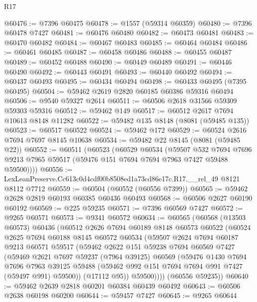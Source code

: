 \begin{lexlean}{R17}
\begin{coremodule}
@60476 := @7396 @60475
@60478 := @1557 (@59314 @60359)
@60480 := @7396 @60478 @7427
@60481 := @60476 @60480
@60482 := @60473 @60481
@60483 := @60470 @60482
@60484 := @60467 @60483
@60485 := @60464 @60484
@60486 := @60461 @60485
@60487 := @60458 @60486
@60488 := @60455 @60487
@60489 := @60452 @60488
@60490 := @60449 @60489
@60491 := @60446 @60490
@60492 := @60443 @60491
@60493 := @60440 @60492
@60494 := @60437 @60493
@60495 := @60434 @60494
@60498 := @60433 @60495 (@7395 @60495)
@60504 := @59462 @2619 @2820 @60185 @60386 @59316 @60494
@60506 := @9540 @59327 @2614
@60511 := @60506 @2618 @31566 @59309 @59303 @59316
@60512 := @59462 @149
@60517 := @60512 @2617 @7694 @10613 @8148 @11282
@60522 := @59482 @135 @8148 (@8081 (@59485 @135))
@60523 := @60517 @60522
@60524 := @59462 @172
@60529 := @60524 @2616 @7694 @7697 @8145 @10638
@60534 := @59482 @22 @8145 (@8081 (@59485 @22))
@60552 := @60511
    (@60523
      (@60529
        @60534
        (@59507
          @532
          @7694
          @7696
          @9213
          @7965
          @59517
          (@59476 @151 @7694 @7694 @7963 @7427 @59488 @59500))))
@60556 := LexLeanPreserve.Cc613c0d4cdf00b8508ed1a73cd86e17c.R17.__rel_49 @8121 @8112 @7712
@60559 := @60504 (@60552 (@60556 @7399))
@60565 := @59462 @2628 @2819 @60193 @60385 @60436 @60493
@60568 := @60506 @2627 @60190 @60192
@60569 := @225 @59235
@60571 := @7396 @60569 @7427
@60572 := @9265 @60571
@60573 := @9341 @60572
@60634 := @60565
    (@60568
      (@13503 @60573)
      @60436
      (@60512
        @2626
        @7694
        @60189
        @8148
        @60573
        @60522
        (@60524
          @2625
          @7694
          @60188
          @8145
          @60572
          @60534
          (@59507
            @2624
            @7694
            @60187
            @9213
            @60571
            @59517
            (@59462
              @2622
              @151
              @59238
              @7694
              @60569
              @7427
              (@59469
                @2621
                @7697
                @59237
                (@7964 @39125)
                @60569
                (@59476
                  @1430
                  @7694
                  @7696
                  @7963
                  @39125
                  @59488
                  (@59462 @992 @151 @7694 @7694 @991 @7427 (@59497 @991) @59500))
                (@17112 @95))
              @59500))))
      (@60556 @59235))
@60640 := @59462 @2639 @2818 @60201 @60384 @60439 @60492
@60643 := @60506 @2638 @60198 @60200
@60644 := @59457 @7427
@60645 := @9265 @60644

\end{coremodule}
\end{lexlean}
